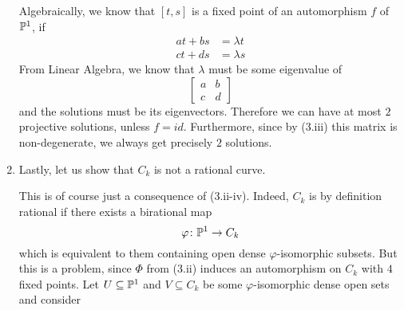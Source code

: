 \documentclass[a4paper, 12pt]{article}
\begin{document}
\begin{Exercise}
\begin{enumerate}[label=(\roman*)]
             Algebraically, we know that $[t, s]$ is a fixed point of an automorphism $f$ of $\P^1$,
             if
             \begin{align*}
                 a t + b s &= \lambda t \\
                 c t + d s &= \lambda s
             \end{align*}
             From Linear Algebra, we know that $\lambda$ must be some eigenvalue of
             \[
                 \begin{bmatrix}
                     a & b \\
                     c & d
                 \end{bmatrix}
             \]
             and the solutions must be its eigenvectors.
             Therefore we can have at most $2$ projective solutions,
             unless $f = id$.
             Furthermore, since by (3.iii) this matrix is non-degenerate,
             we always get precisely $2$ solutions.
         \item Lastly, let us show that $C_k$ is not a rational curve.

             This is of course just a consequence of (3.ii-iv).
             Indeed, $C_k$ is by definition rational if there exists a birational map
             \[
                 \varphi \colon \P^1 \to C_k
             \]
             which is equivalent to them containing open dense $\varphi$-isomorphic subsets.
             But this is a problem, since $\Phi$ from (3.ii) induces an automorphism on $C_k$ with $4$ fixed points.
             Let $U \subseteq \P^1$ and $V \subseteq C_k$ be some $\varphi$-isomorphic dense open sets and consider


\end{enumerate}
\end{Exercise}
\end{document}
